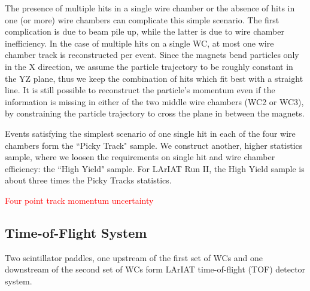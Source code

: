 The presence of multiple hits in a single wire chamber or the absence of hits in one (or more) wire chambers can complicate this simple scenario. The first complication is due to beam pile up, while the latter is due to wire chamber inefficiency. In the case of multiple hits on a single WC, at most one wire chamber track is reconstructed per event. Since the magnets bend particles only in the X direction, we assume the particle trajectory to be roughly constant in the YZ plane, thus we keep the combination of hits which fit best with a straight line. 
It is still possible to reconstruct the particle's momentum  even if the information is missing in either of the two middle wire chambers (WC2 or WC3), by constraining the particle trajectory to cross the plane in between the magnets. 

Events satisfying the simplest scenario of one single hit in each of the four wire chambers form the ``Picky Track" sample.  We construct another, higher statistics sample, where we loosen the requirements on single hit and wire chamber efficiency: the ``High Yield" sample. For LArIAT Run II, the High Yield sample is about three times the Picky Tracks statistics.  


\textcolor{red}{Four point track momentum uncertainty}

\subsection{Time-of-Flight System}\label{sec:TOF}
Two scintillator paddles, one upstream of the first set of WCs and one downstream of the second set of WCs  form LArIAT  time-of-flight (TOF) detector system. 

